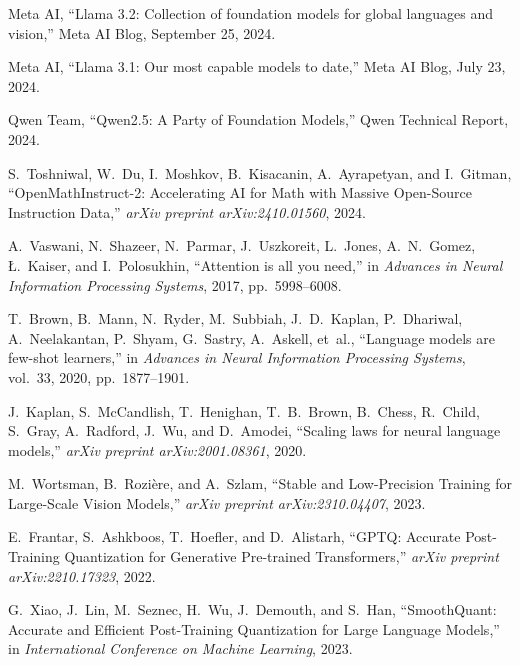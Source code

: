 \documentclass[conference]{IEEEtran}
\begin{document}
\begin{thebibliography}{40}
Meta AI, 
``Llama 3.2: Collection of foundation models for global languages and vision,'' 
Meta AI Blog, September 25, 2024.

Meta AI,
``Llama 3.1: Our most capable models to date,''
Meta AI Blog, July 23, 2024.

Qwen Team,
``Qwen2.5: A Party of Foundation Models,''
Qwen Technical Report, 2024.

S.~Toshniwal, W.~Du, I.~Moshkov, B.~Kisacanin, A.~Ayrapetyan, and I.~Gitman, 
``OpenMathInstruct-2: Accelerating AI for Math with Massive Open-Source Instruction Data,'' 
\emph{arXiv preprint arXiv:2410.01560}, 2024.

A.~Vaswani, N.~Shazeer, N.~Parmar, J.~Uszkoreit, L.~Jones, A.~N.~Gomez, {\L}.~Kaiser, and I.~Polosukhin,
``Attention is all you need,''
in \emph{Advances in Neural Information Processing Systems}, 2017, pp.~5998--6008.

T.~Brown, B.~Mann, N.~Ryder, M.~Subbiah, J.~D.~Kaplan, P.~Dhariwal, A.~Neelakantan, P.~Shyam, G.~Sastry, A.~Askell, et~al.,
``Language models are few-shot learners,''
in \emph{Advances in Neural Information Processing Systems}, vol.~33, 2020, pp.~1877--1901.

J.~Kaplan, S.~McCandlish, T.~Henighan, T.~B.~Brown, B.~Chess, R.~Child, S.~Gray, A.~Radford, J.~Wu, and D.~Amodei,
``Scaling laws for neural language models,''
\emph{arXiv preprint arXiv:2001.08361}, 2020.

M.~Wortsman, B.~Rozière, and A.~Szlam,
``Stable and Low-Precision Training for Large-Scale Vision Models,''
\emph{arXiv preprint arXiv:2310.04407}, 2023.

E.~Frantar, S.~Ashkboos, T.~Hoefler, and D.~Alistarh,
``GPTQ: Accurate Post-Training Quantization for Generative Pre-trained Transformers,''
\emph{arXiv preprint arXiv:2210.17323}, 2022.

G.~Xiao, J.~Lin, M.~Seznec, H.~Wu, J.~Demouth, and S.~Han,
``SmoothQuant: Accurate and Efficient Post-Training Quantization for Large Language Models,''
in \emph{International Conference on Machine Learning}, 2023.

\end{thebibliography}
\end{document}
